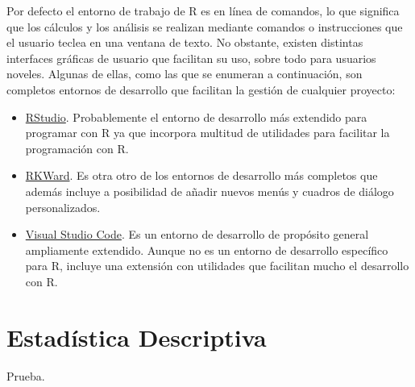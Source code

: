 \documentclass[
  a4paper,
]{scrreport}
\begin{document}
Por defecto el entorno de trabajo de R es en línea de comandos, lo que
significa que los cálculos y los análisis se realizan mediante comandos
o instrucciones que el usuario teclea en una ventana de texto. No
obstante, existen distintas interfaces gráficas de usuario que facilitan
su uso, sobre todo para usuarios noveles. Algunas de ellas, como las que
se enumeran a continuación, son completos entornos de desarrollo que
facilitan la gestión de cualquier proyecto:

\begin{itemize}
\item
  \href{https://www.rstudio.com/}{RStudio}. Probablemente el entorno de
  desarrollo más extendido para programar con R ya que incorpora
  multitud de utilidades para facilitar la programación con R.
\item
  \href{https://rkward.kde.org}{RKWard}. Es otra otro de los entornos de
  desarrollo más completos que además incluye a posibilidad de añadir
  nuevos menús y cuadros de diálogo personalizados.
\item
  \href{https://code.visualstudio.com/}{Visual Studio Code}. Es un
  entorno de desarrollo de propósito general ampliamente extendido.
  Aunque no es un entorno de desarrollo específico para R, incluye una
  extensión con utilidades que facilitan mucho el desarrollo con R.
\end{itemize}


\hypertarget{estaduxedstica-descriptiva}{%
\chapter{Estadística Descriptiva}\label{estaduxedstica-descriptiva}}

Prueba.
\end{document}
